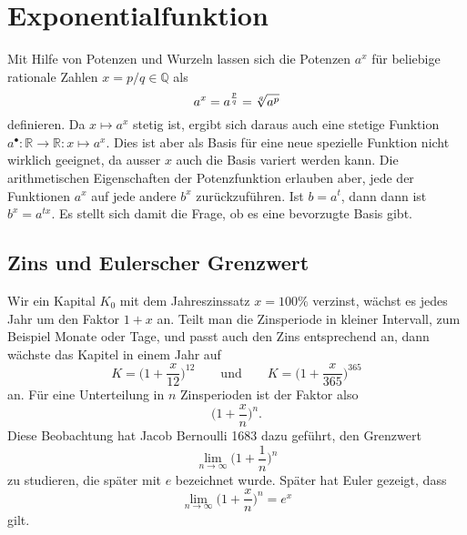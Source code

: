 %
%
%
\section{Exponentialfunktion 
\label{buch:exponential:section:grenzwert}}
Mit Hilfe von Potenzen und Wurzeln lassen sich die Potenzen $a^x$
für beliebige rationale Zahlen $x=p/q\in\mathbb{Q}$ als
\[
a^x = a^{\frac{p}{q}} = \root{q}\of{a^p}
\]
definieren.
Da $x\mapsto a^x$ stetig ist, ergibt sich daraus auch eine
stetige Funktion
$a^{\bullet}\colon \mathbb{R}\to\mathbb{R}:x\mapsto a^x$.
Dies ist aber als Basis für eine neue spezielle Funktion nicht
wirklich geeignet, da ausser $x$ auch die Basis variert werden kann.
Die arithmetischen Eigenschaften der Potenzfunktion erlauben aber,
jede der Funktionen $a^x$ auf jede andere $b^x$ zurückzuführen.
Ist $b=a^t$, dann dann ist $b^x = a^{tx}$.
Es stellt sich damit die Frage, ob es eine bevorzugte Basis gibt.

\subsection{Zins und Eulerscher Grenzwert}
Wir ein Kapital $K_0$ mit dem Jahreszinssatz $x=100\%$ verzinst,
wächst es jedes Jahr um den Faktor $1+x$ an.
Teilt man die Zinsperiode in kleiner Intervall, zum Beispiel Monate
oder Tage, und passt auch den Zins entsprechend an, dann wächste
das Kapitel in einem Jahr auf
\[
K = \biggl(1+\frac{x}{12}\biggr)^{12}
\qquad\text{und}\qquad
K = \biggl(1+\frac{x}{365}\biggr)^{365}
\]
an.
Für eine Unterteilung in $n$ Zinsperioden ist der Faktor also
\[
\biggl(1+\frac{x}{n}\biggr)^n.
\]
Diese Beobachtung hat Jacob Bernoulli 1683 dazu geführt, den Grenzwert
\[
\lim_{n\to\infty} \biggl(1+\frac1n\biggr)^n
\]
zu studieren, die später mit $e$ bezeichnet wurde.
Später hat Euler gezeigt, dass 
\begin{equation}
\lim_{n\to\infty}\biggl(1+\frac{x}{n}\biggr)^n
=
e^x
\label{buch:exponential:zins:eulerex}
\end{equation}
gilt.

